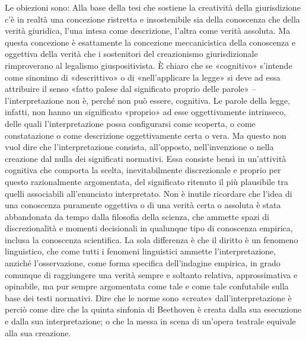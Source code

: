Le obiezioni sono:
Alla base della tesi che sostiene la creatività della giurisdizione c’è in realtà una concezione ristretta e insostenibile sia della conoscenza che della verità giuridica, l’una intesa come descrizione, l’altra come verità assoluta. Ma questa concezione è esattamente la concezione meccanicistica della conoscenza e oggettiva della verità che i sostenitori del creazionismo giurisdizionale rimproverano al legalismo giuspositivista. È chiaro che se «cognitivo» s’intende come sinonimo di «descrittivo» o di «nell’applicare la legge» si deve ad essa attribuire il senso «fatto palese dal significato proprio delle parole» – l’interpretazione non è, perché non può essere, cognitiva. Le parole della legge, infatti, non hanno un significato «proprio» ad esse oggettivamente intrinseco, delle quali l’interpretazione possa configurarsi come scoperta, o come constatazione o come descrizione oggettivamente certa o vera. Ma questo non vuol dire che l’interpretazione consista, all’opposto, nell’invenzione o nella creazione dal nulla dei significati normativi. Essa consiste bensì in un’attività cognitiva che comporta la scelta, inevitabilmente discrezionale e proprio per questo razionalmente argomentata, del significato ritenuto il più plausibile tra quelli associabili all’enunciato interpretato. Non è inutile ricordare che l’idea di una conoscenza puramente oggettiva o di una verità certa o assoluta è stata abbandonata da tempo dalla filosofia della scienza, che ammette spazi di discrezionalità e momenti decisionali in qualunque tipo di conoscenza empirica, inclusa la conoscenza scientifica. La sola differenza è che il diritto è un fenomeno linguistico, che come tutti i fenomeni linguistici ammette l’interpretazione, anziché l’osservazione, come forma specifica dell’indagine empirica, in grado comunque di raggiungere una verità sempre e soltanto relativa, approssimativa e opinabile, ma pur sempre argomentata come tale e come tale confutabile sulla base dei testi normativi. Dire che le norme sono «create» dall’interpretazione è perciò come dire che la quinta sinfonia di Beethoven è creata dalla sua esecuzione e dalla sua interpretazione; o che la messa in scena di un’opera teatrale equivale alla sua creazione.
